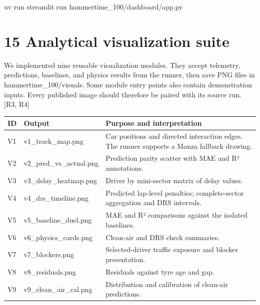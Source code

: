 \documentclass[11pt,a4paper,oneside]{report}
\begin{document}
uv run streamlit run hammertime\_100/dashboard/app.py

\clearpage

\clearpage\chapter*{15 Analytical visualization suite}

We implemented nine reusable visualization modules. They accept telemetry, predictions, baselines, and physics results from the runner, then save PNG files in hammertime\_100/visuals. Some module entry points also contain demonstration inputs. Every published image should therefore be paired with its source run. [R3, R4]


\begin{center}\small\begin{tabularx}{\textwidth}{@{}>{\raggedright\arraybackslash}X>{\raggedright\arraybackslash}X>{\raggedright\arraybackslash}X@{}}

\toprule

ID & Output & Purpose and interpretation \\

\midrule

V1 & v1\_track\_map.png & Car positions and directed interaction edges. The runner supports a Monza fallback drawing. \\

V2 & v2\_pred\_vs\_actual.png & Prediction parity scatter with MAE and R² annotations. \\

V3 & v3\_delay\_heatmap.png & Driver by mini-sector matrix of delay values. \\

V4 & v4\_drs\_timeline.png & Predicted lap-level penalties; complete-sector aggregation and DRS intervals. \\

V5 & v5\_baseline\_duel.png & MAE and R² comparisons against the isolated baselines. \\

V6 & v6\_physics\_cards.png & Clean-air and DRS check summaries. \\

V7 & v7\_blockers.png & Selected-driver traffic exposure and blocker presentation. \\

V8 & v8\_residuals.png & Residuals against tyre age and gap. \\

V9 & v9\_clean\_air\_cal.png & Distribution and calibration of clean-air predictions. \\

\bottomrule\end{tabularx}\end{center}
\end{document}

